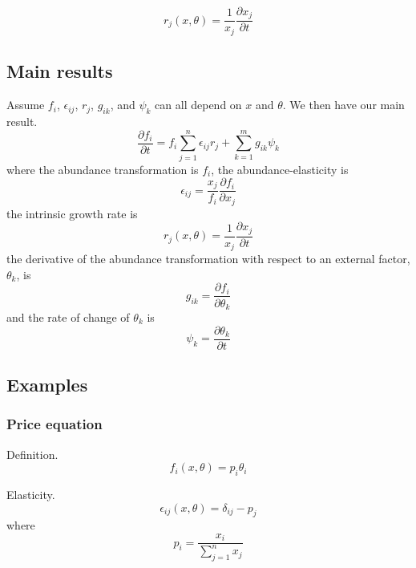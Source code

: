 \documentclass{article}
\begin{document}
\begin{equation}
r_j(x, \theta) = \frac{1}{x_j}\frac{\partial x_j}{\partial t}
\end{equation}

\subsection{Main results}

Assume $f_i$, $\epsilon_{ij}$, $r_j$, $g_{ik}$, and $\psi_k$ can all depend on $x$ and $\theta$. We then have our main result.
\begin{equation}
\frac{\partial f_i}{\partial t} = 
f_i\sum_{j = 1}^n\epsilon_{ij}r_j + \sum_{k = 1}^mg_{ik}\psi_k
\end{equation}
where the abundance transformation is $f_i$, the abundance-elasticity is
\begin{equation}
\epsilon_{ij} = 
\frac{x_j}{f_i}
\frac{\partial f_i}{\partial x_j}
\end{equation}
the intrinsic growth rate is
\begin{equation}
r_j(x, \theta) = \frac{1}{x_j}\frac{\partial x_j}{\partial t}
\end{equation}
the derivative of the abundance transformation with respect to an external factor, $\theta_k$, is
\begin{equation}
g_{ik} = \frac{\partial f_i}{\partial \theta_k}
\end{equation}
and the rate of change of $\theta_k$ is
\begin{equation}
\psi_k = \frac{\partial \theta_k}{\partial t}
\end{equation}

\subsection{Examples}

\subsubsection{Price equation}

Definition.
\begin{equation}
f_i(x, \theta) = p_i\theta_i
\end{equation}

Elasticity.
\begin{equation}
\epsilon_{ij}(x, \theta) = \delta_{ij} - p_j
\end{equation}
where
\begin{equation}
p_i = \frac{x_i}{\sum_{j = 1}^n x_j}
\end{equation}
\end{document}
